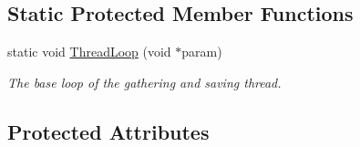 \subsection*{Static Protected Member Functions}
\begin{DoxyCompactItemize}
\item 
static void \hyperlink{class_result_manager_a0aff477d777703dd9f1e01ba0bd6f2d8}{Thread\+Loop} (void $\ast$param)
\begin{DoxyCompactList}\small\item\em The base loop of the gathering and saving thread. \end{DoxyCompactList}\end{DoxyCompactItemize}
\subsection*{Protected Attributes}

